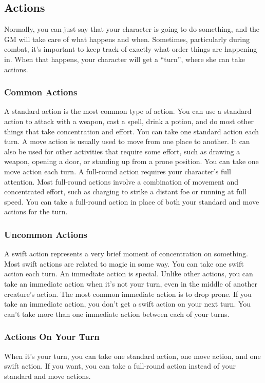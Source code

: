 \subsection{Actions}
Normally, you can just say that your character is going to do something, and the GM will take care of what happens and when. Sometimes, particularly during combat, it's important to keep track of exactly what order things are happening in. When that happens, your character will get a ``turn'', where she can take actions.

\subsubsection{Common Actions}
 A standard action is the most common type of action. You can use a standard action to attack with a weapon, cast a spell, drink a potion, and do most other things that take concentration and effort. You can take one standard action each turn.
 A move action is usually used to move from one place to another. It can also be used for other activities that require some effort, such as drawing a weapon, opening a door, or standing up from a prone position. You can take one move action each turn.
 A full-round action requires your character's full attention. Most full-round actions involve a combination of movement and concentrated effort, such as charging to strike a distant foe or running at full speed. You can take a full-round action in place of both your standard and move actions for the turn.

\subsubsection{Uncommon Actions}
 A swift action represents a very brief moment of concentration on something. Most swift actions are related to magic in some way. You can take one swift action each turn.
 An immediate action is special. Unlike other actions, you can take an immediate action when it's not your turn, even in the middle of another creature's action. The most common immediate action is to drop prone. If you take an immediate action, you don't get a swift action on your next turn. You can't take more than one immediate action between each of your turns.

\subsubsection{Actions On Your Turn}
When it's your turn, you can take one standard action, one move action, and one swift action. If you want, you can take a full-round action instead of your standard and move actions.


